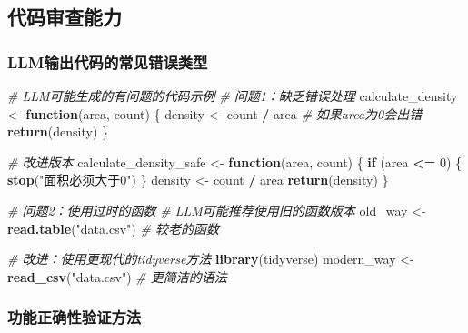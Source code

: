 \documentclass[
]{book}
\newenvironment{Shaded}{\begin{snugshade}}{\end{snugshade}}
\newcommand{\CommentTok}[1]{\textcolor[rgb]{0.56,0.35,0.01}{\textit{#1}}}
\newcommand{\ControlFlowTok}[1]{\textcolor[rgb]{0.13,0.29,0.53}{\textbf{#1}}}
\newcommand{\DecValTok}[1]{\textcolor[rgb]{0.00,0.00,0.81}{#1}}
\newcommand{\FunctionTok}[1]{\textcolor[rgb]{0.13,0.29,0.53}{\textbf{#1}}}
\newcommand{\NormalTok}[1]{#1}
\newcommand{\OtherTok}[1]{\textcolor[rgb]{0.56,0.35,0.01}{#1}}
\newcommand{\SpecialCharTok}[1]{\textcolor[rgb]{0.81,0.36,0.00}{\textbf{#1}}}
\newcommand{\StringTok}[1]{\textcolor[rgb]{0.31,0.60,0.02}{#1}}
\begin{document}
\hypertarget{ux4ee3ux7801ux5ba1ux67e5ux80fdux529b}{%
\subsection{代码审查能力}\label{ux4ee3ux7801ux5ba1ux67e5ux80fdux529b}}

\hypertarget{llmux8f93ux51faux4ee3ux7801ux7684ux5e38ux89c1ux9519ux8befux7c7bux578b}{%
\subsubsection{LLM输出代码的常见错误类型}\label{llmux8f93ux51faux4ee3ux7801ux7684ux5e38ux89c1ux9519ux8befux7c7bux578b}}

\begin{Shaded}
\begin{Highlighting}[]
\CommentTok{\# LLM可能生成的有问题的代码示例}
\CommentTok{\# 问题1：缺乏错误处理}
\NormalTok{calculate\_density }\OtherTok{\textless{}{-}} \ControlFlowTok{function}\NormalTok{(area, count) \{}
\NormalTok{  density }\OtherTok{\textless{}{-}}\NormalTok{ count }\SpecialCharTok{/}\NormalTok{ area  }\CommentTok{\# 如果area为0会出错}
  \FunctionTok{return}\NormalTok{(density)}
\NormalTok{\}}

\CommentTok{\# 改进版本}
\NormalTok{calculate\_density\_safe }\OtherTok{\textless{}{-}} \ControlFlowTok{function}\NormalTok{(area, count) \{}
  \ControlFlowTok{if}\NormalTok{ (area }\SpecialCharTok{\textless{}=} \DecValTok{0}\NormalTok{) \{}
    \FunctionTok{stop}\NormalTok{(}\StringTok{"面积必须大于0"}\NormalTok{)}
\NormalTok{  \}}
\NormalTok{  density }\OtherTok{\textless{}{-}}\NormalTok{ count }\SpecialCharTok{/}\NormalTok{ area}
  \FunctionTok{return}\NormalTok{(density)}
\NormalTok{\}}

\CommentTok{\# 问题2：使用过时的函数}
\CommentTok{\# LLM可能推荐使用旧的函数版本}
\NormalTok{old\_way }\OtherTok{\textless{}{-}} \FunctionTok{read.table}\NormalTok{(}\StringTok{"data.csv"}\NormalTok{)  }\CommentTok{\# 较老的函数}

\CommentTok{\# 改进：使用更现代的tidyverse方法}
\FunctionTok{library}\NormalTok{(tidyverse)}
\NormalTok{modern\_way }\OtherTok{\textless{}{-}} \FunctionTok{read\_csv}\NormalTok{(}\StringTok{"data.csv"}\NormalTok{)  }\CommentTok{\# 更简洁的语法}
\end{Highlighting}
\end{Shaded}

\hypertarget{ux529fux80fdux6b63ux786eux6027ux9a8cux8bc1ux65b9ux6cd5}{%
\subsubsection{功能正确性验证方法}\label{ux529fux80fdux6b63ux786eux6027ux9a8cux8bc1ux65b9ux6cd5}}
\end{document}
